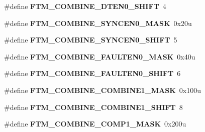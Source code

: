 \begin{DoxyCompactItemize}
\item 
\#define {\bfseries F\+T\+M\+\_\+\+C\+O\+M\+B\+I\+N\+E\+\_\+\+D\+T\+E\+N0\+\_\+\+S\+H\+I\+FT}~4\hypertarget{group__FTM__Register__Masks_gaab1a185d98eb899fea411daf0386858a}{}\label{group__FTM__Register__Masks_gaab1a185d98eb899fea411daf0386858a}

\item 
\#define {\bfseries F\+T\+M\+\_\+\+C\+O\+M\+B\+I\+N\+E\+\_\+\+S\+Y\+N\+C\+E\+N0\+\_\+\+M\+A\+SK}~0x20u\hypertarget{group__FTM__Register__Masks_gafd208921dc5f1d7dde730c67776bce8a}{}\label{group__FTM__Register__Masks_gafd208921dc5f1d7dde730c67776bce8a}

\item 
\#define {\bfseries F\+T\+M\+\_\+\+C\+O\+M\+B\+I\+N\+E\+\_\+\+S\+Y\+N\+C\+E\+N0\+\_\+\+S\+H\+I\+FT}~5\hypertarget{group__FTM__Register__Masks_gab9eba65827e4b667e34b89f58640b960}{}\label{group__FTM__Register__Masks_gab9eba65827e4b667e34b89f58640b960}

\item 
\#define {\bfseries F\+T\+M\+\_\+\+C\+O\+M\+B\+I\+N\+E\+\_\+\+F\+A\+U\+L\+T\+E\+N0\+\_\+\+M\+A\+SK}~0x40u\hypertarget{group__FTM__Register__Masks_gad373b84d922eba1365283a7ebb5d87f4}{}\label{group__FTM__Register__Masks_gad373b84d922eba1365283a7ebb5d87f4}

\item 
\#define {\bfseries F\+T\+M\+\_\+\+C\+O\+M\+B\+I\+N\+E\+\_\+\+F\+A\+U\+L\+T\+E\+N0\+\_\+\+S\+H\+I\+FT}~6\hypertarget{group__FTM__Register__Masks_gac0b55b271d7734489d9e53b0d2ad1a64}{}\label{group__FTM__Register__Masks_gac0b55b271d7734489d9e53b0d2ad1a64}

\item 
\#define {\bfseries F\+T\+M\+\_\+\+C\+O\+M\+B\+I\+N\+E\+\_\+\+C\+O\+M\+B\+I\+N\+E1\+\_\+\+M\+A\+SK}~0x100u\hypertarget{group__FTM__Register__Masks_ga5378f59bc8234381865e973deb638b6f}{}\label{group__FTM__Register__Masks_ga5378f59bc8234381865e973deb638b6f}

\item 
\#define {\bfseries F\+T\+M\+\_\+\+C\+O\+M\+B\+I\+N\+E\+\_\+\+C\+O\+M\+B\+I\+N\+E1\+\_\+\+S\+H\+I\+FT}~8\hypertarget{group__FTM__Register__Masks_gaf9a5abb2341af83a58d95ccb704d8a11}{}\label{group__FTM__Register__Masks_gaf9a5abb2341af83a58d95ccb704d8a11}

\item 
\#define {\bfseries F\+T\+M\+\_\+\+C\+O\+M\+B\+I\+N\+E\+\_\+\+C\+O\+M\+P1\+\_\+\+M\+A\+SK}~0x200u\hypertarget{group__FTM__Register__Masks_ga24a8dd787f2e00cde644bf23a4c16123}{}\label{group__FTM__Register__Masks_ga24a8dd787f2e00cde644bf23a4c16123}


\end{DoxyCompactItemize}
